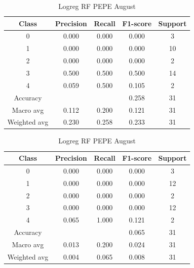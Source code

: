 \begin{enumerate}
\begin{enumerate}
            \begin{table}[H]
            \centering
            \scriptsize
            \begin{minipage}{0.48\textwidth}
            \centering
            \begin{tabular}{c|cccc}
            \hline
            Class & Precision & Recall & F1-score & Support \\
            \hline
            0 & 0.000 & 0.000 & 0.000 & 3 \\
            1 & 0.000 & 0.000 & 0.000 & 10 \\
            2 & 0.000 & 0.000 & 0.000 & 2 \\
            3 & 0.500 & 0.500 & 0.500 & 14 \\
            4 & 0.059 & 0.500 & 0.105 & 2 \\
            \hline
            Accuracy &       &      & 0.258 & 31 \\
            Macro avg & 0.112 & 0.200 & 0.121 & 31 \\
            Weighted avg & 0.230 & 0.258 & 0.233 & 31 \\
            \hline
            \end{tabular}
            \caption{Logreg RF DOGE August}
            \label{tab:classifier_2_report_logreg_rf_doge_filtered_aug}
            \end{minipage}%
            \hfill
            \begin{minipage}{0.48\textwidth}
            \centering
            \begin{tabular}{c|cccc}
            \hline
            Class & Precision & Recall & F1-score & Support \\
            \hline
            0 & 0.000 & 0.000 & 0.000 & 3 \\
            1 & 0.000 & 0.000 & 0.000 & 12 \\
            2 & 0.000 & 0.000 & 0.000 & 2 \\
            3 & 0.000 & 0.000 & 0.000 & 12 \\
            4 & 0.065 & 1.000 & 0.121 & 2 \\
            \hline
            Accuracy &       &      & 0.065 & 31 \\
            Macro avg & 0.013 & 0.200 & 0.024 & 31 \\
            Weighted avg & 0.004 & 0.065 & 0.008 & 31 \\
            \hline
            \end{tabular}
            \caption{Logreg RF PEPE August}
            \label{tab:classifier_2_report_logreg_rf_pepe_filtered_aug}
            \end{minipage}
            

\end{table}
\end{enumerate}
\end{enumerate}
